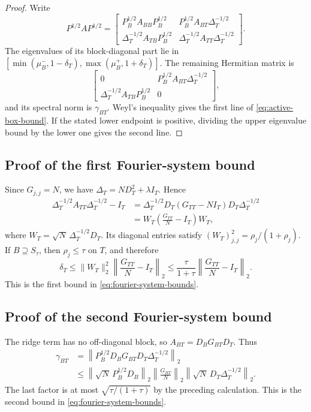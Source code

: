 \begin{proof}
Write
\[
P^{1/2}AP^{1/2}
=
\begin{bmatrix}
P_B^{1/2}A_{BB}P_B^{1/2}
&P_B^{1/2}A_{BT}\Delta_T^{-1/2}\\
\Delta_T^{-1/2}A_{TB}P_B^{1/2}
&\Delta_T^{-1/2}A_{TT}\Delta_T^{-1/2}
\end{bmatrix}.
\]
The eigenvalues of its block-diagonal part lie in
\([\min(\mu_B^-,1-\delta_T),
\max(\mu_B^+,1+\delta_T)]\). The remaining Hermitian matrix is
\[
\begin{bmatrix}
0&P_B^{1/2}A_{BT}\Delta_T^{-1/2}\\
\Delta_T^{-1/2}A_{TB}P_B^{1/2}&0
\end{bmatrix},
\]
and its spectral norm is \(\gamma_{BT}\). Weyl's inequality gives the first
line of \cref{eq:active-box-bound}. If the stated lower endpoint is positive,
dividing the upper eigenvalue bound by the lower one gives the second line.
\end{proof}

\subsection{Proof of the first Fourier-system bound}

Since \(G_{j,j}=N\), we have \(\Delta_T=ND_T^2+\lambda I_T\). Hence
\begin{align*}
\Delta_T^{-1/2}A_{TT}\Delta_T^{-1/2}-I_T
&=
\Delta_T^{-1/2}D_T(G_{TT}-NI_T)D_T\Delta_T^{-1/2}\\
&=
W_T\left(\frac{G_{TT}}{N}-I_T\right)W_T,
\end{align*}
where \(W_T=\sqrt N\,\Delta_T^{-1/2}D_T\). Its diagonal entries satisfy
\((W_T)_{j,j}^2=\rho_j/(1+\rho_j)\). If \(B\supseteq S_\tau\), then
\(\rho_j\leq\tau\) on \(T\), and therefore
\[
\delta_T
\leq \|W_T\|_2^2
\left\|\frac{G_{TT}}{N}-I_T\right\|_2
\leq
\frac{\tau}{1+\tau}
\left\|\frac{G_{TT}}{N}-I_T\right\|_2.
\]
This is the first bound in \cref{eq:fourier-system-bounds}.

\subsection{Proof of the second Fourier-system bound}

The ridge term has no off-diagonal block, so
\(A_{BT}=D_BG_{BT}D_T\). Thus
\begin{align*}
\gamma_{BT}
&=
\left\|P_B^{1/2}D_BG_{BT}D_T\Delta_T^{-1/2}\right\|_2\\
&\leq
\left\|\sqrt N\,P_B^{1/2}D_B\right\|_2
\left\|\frac{G_{BT}}{N}\right\|_2
\left\|\sqrt N\,D_T\Delta_T^{-1/2}\right\|_2.
\end{align*}
The last factor is at most \(\sqrt{\tau/(1+\tau)}\) by the preceding
calculation. This is the second bound in \cref{eq:fourier-system-bounds}.

